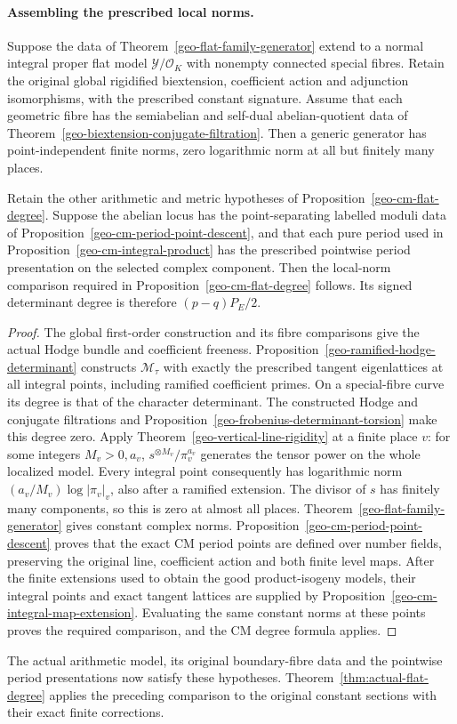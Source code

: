\paragraph{Assembling the prescribed local norms.}
\begin{corollary}\label{geo-flat-norm-assembly}
Suppose the data of Theorem~\ref{geo-flat-family-generator} extend
to a normal integral proper flat
model $\mathcal Y/\mathcal O_K$ with nonempty connected special
fibres. Retain the original global rigidified biextension,
coefficient action and adjunction isomorphisms, with the prescribed
constant signature. Assume that each geometric fibre has the
semiabelian and self-dual abelian-quotient data of
Theorem~\ref{geo-biextension-conjugate-filtration}.
Then a generic generator has point-independent finite norms,
zero logarithmic norm at all but finitely many places.

Retain the other arithmetic and metric hypotheses of
Proposition~\ref{geo-cm-flat-degree}. Suppose the abelian locus has
the point-separating labelled moduli data of
Proposition~\ref{geo-cm-period-point-descent}, and that each pure period
used in Proposition~\ref{geo-cm-integral-product} has the prescribed
pointwise period presentation on the selected complex component.
Then the local-norm comparison required in
Proposition~\ref{geo-cm-flat-degree} follows. Its signed determinant degree is therefore
$(p-q)P_E/2$.
\end{corollary}
\begin{proof}
The global first-order construction and its fibre comparisons give the
actual Hodge bundle and coefficient freeness.
Proposition~\ref{geo-ramified-hodge-determinant} constructs
$\mathcal M_\tau$ with exactly the prescribed tangent eigenlattices
at all integral points, including ramified coefficient primes.
On a special-fibre curve its degree is that of the character determinant.
The constructed Hodge and conjugate filtrations and
Proposition~\ref{geo-frobenius-determinant-torsion} make this degree zero.
Apply Theorem~\ref{geo-vertical-line-rigidity}
at a finite place $v$: for some integers $M_v>0,a_v$,
$s^{\otimes M_v}/\pi_v^{a_v}$ generates the tensor power
on the whole localized model. Every integral point consequently
has logarithmic norm
$(a_v/M_v)\log|\pi_v|_v$, also after a ramified extension.
The divisor of $s$ has finitely many components, so this is zero
at almost all places. Theorem~\ref{geo-flat-family-generator}
gives constant complex norms.
Proposition~\ref{geo-cm-period-point-descent} proves that the exact CM
period points are defined over number fields, preserving the original line,
coefficient action and both finite level maps. After the finite
extensions used to obtain the good product-isogeny models,
their integral points and exact tangent lattices are supplied by
Proposition~\ref{geo-cm-integral-map-extension}. Evaluating the same
constant norms at these points proves the required comparison, and
the CM degree formula applies.
\end{proof}

The actual arithmetic model, its original boundary-fibre data and the
pointwise period presentations now satisfy these hypotheses.
Theorem~\ref{thm:actual-flat-degree} applies the preceding comparison
to the original constant sections with their exact finite corrections.
